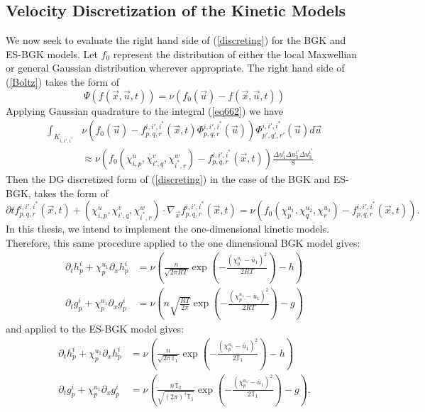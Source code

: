 \subsection{Velocity Discretization of the Kinetic Models}
We now seek to evaluate the right hand side of (\ref{discreting}) for the BGK and ES-BGK models. Let $f_0$ represent the distribution of either the local Maxwellian or general Gaussian distribution wherever appropriate. The right hand side of (\ref{Boltz}) takes the form of
%
\begin{equation}
\label{eq662}
\Psi(f(\vec{x},\vec{u},t)) = \nu \left( f_0(\vec{u}) - f(\vec{x},\vec{u},t) \right)
\end{equation}
%
Applying Gaussian quadrature to the integral (\ref{eq662}) we have
%
\begin{align*}
\int_{K_{i,i',i^*}} &\nu \left( f_0(\vec{u}) - f^{i,i',i^*}_{p,q,r}(\vec{x},t)\Phi^{i,i',i^*}_{p,q,r}(\vec{u}) \right) \Phi^{i,i',i^*}_{p',q',r'}(\vec{u}) d\vec{u} \\
&\approx \nu \left( f_0(\chi_{i,p}^u,\chi_{i',q}^v,\chi_{i^*,r}^w) - f^{i,i',i^*}_{p,q,r}(\vec{x},t) \right) \frac{\Delta u_1^i \Delta u_3^{i'} \Delta u_3^{i^*}}{8}
\end{align*}
%
Then the DG discretized form of (\ref{discreting}) in the case of the BGK and ES-BGK, takes the form of
%
\begin{equation}
\label{DG_BGK_ES}
\partial t f^{i,i',i^*}_{p,q,r}(\vec{x},t) + (\chi_{i,p}^u,\chi_{i',q}^v,\chi_{i^*,r}^w) \cdot \nabla_{\vec{x}} f^{i,i',i^*}_{p,q,r}(\vec{x},t)
= \nu \left( f_0(\chi_{p}^{u_1},\chi_{q}^{u_2},\chi_{r}^{u_3}) - f^{i,i',i^*}_{p,q,r}(\vec{x},t) \right).
\end{equation}
%
In this thesis, we intend to implement the one-dimensional kinetic models. Therefore, this same procedure applied to the one dimensional BGK model gives:
%
\begin{align*}
\partial_t h_p^i + \chi_p^{u_1} \partial_x h_p^i &= \nu \left(\frac{n}{\sqrt{2 \pi RT}} \exp \left( - \frac{(\chi_p^{u_1} - \bar{u}_1)^2}{2 R T} \right) - h \right)\\
\partial_t g_p^i + \chi_p^{u_1} \partial_x g_p^i &= \nu \left( n \sqrt{\frac{RT}{2 \pi}} \exp \left( - \frac{(\chi_p^{u_1} - \bar{u}_1)^2}{2 R T} \right) - g \right)
\end{align*}
%
and applied to the ES-BGK model gives:
%
\begin{align*}
\partial_t h_p^i + \chi_p^{u_1} \partial_x h_p^i &= \nu \left(\frac{n}{\sqrt{2 \pi \mathbb{T}_1}} \exp \left( - \frac{(\chi_p^{u_1} - \bar{u}_1)^2}{2 \mathbb{T}_1} \right) - h \right)\\
\partial_t g_p^i + \chi_p^{u_1} \partial_x g_p^i &= \nu \left( \frac{n \mathbb{T}_2}{\sqrt{(2 \pi)^3 \mathbb{T}_1}} \exp \left( - \frac{(\chi_p^{u_1} - \bar{u}_1)^2}{2 \mathbb{T}_1} \right) - g \right).
\end{align*}
